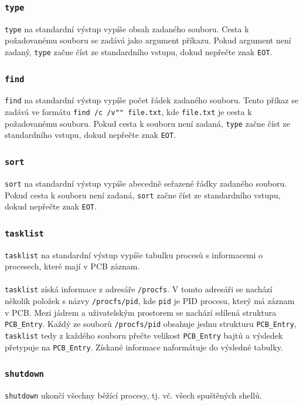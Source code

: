 \documentclass[12pt, a4paper]{article}
\begin{document}
    \subsubsection*{\texttt{type}}
    \texttt{type} na standardní výstup vypíše obsah zadaného souboru. Cesta k požadovanému souboru se zadává jako argument příkazu. Pokud argument není zadaný, \texttt{type} začne číst ze standardního vstupu, dokud nepřečte znak \texttt{EOT}.
    
    \subsubsection*{\texttt{find}}
    \texttt{find} na standardní výstup vypíše počet řádek zadaného souboru. Tento příkaz se zadává ve formátu \texttt{find /c /v"{}"{} file.txt}, kde \texttt{file.txt} je cesta k požadovanému souboru. Pokud cesta k souboru není zadaná, \texttt{type} začne číst ze standardního vstupu, dokud nepřečte znak \texttt{EOT}.
    
    \subsubsection*{\texttt{sort}}
    \texttt{sort} na standardní výstup vypíše abecedně seřazené řádky zadaného souboru. Pokud cesta k souboru není zadaná, \texttt{sort} začne číst ze standardního vstupu, dokud nepřečte znak \texttt{EOT}.
    
    \subsubsection*{\texttt{tasklist}}
    \texttt{tasklist} na standardní výstup vypíše tabulku procesů s informacemi o procesech, které mají v PCB záznam. 
    \\
    \\
	\texttt{tasklist} získá informace z adresáře \texttt{/procfs}. V tomto adresáři se nachází několik položek s názvy \texttt{/procfs/pid}, kde \texttt{pid} je PID procesu, který má záznam v PCB. Mezi jádrem a uživatelským prostorem se nachází sdílená struktura \texttt{PCB\_Entry}. Každý ze souborů \texttt{/procfs/pid} obsahuje jednu strukturu \texttt{PCB\_Entry}, \texttt{tasklist} tedy z každého souboru přečte velikost \texttt{PCB\_Entry} bajtů a výsledek přetypuje na \texttt{PCB\_Entry}. Získané informace naformátuje do výsledné tabulky.
    
    
    \subsubsection*{\texttt{shutdown}}
    \texttt{shutdown} ukončí všechny běžící procesy, tj. vč. všech spuštěných shellů.
    
\end{document}
